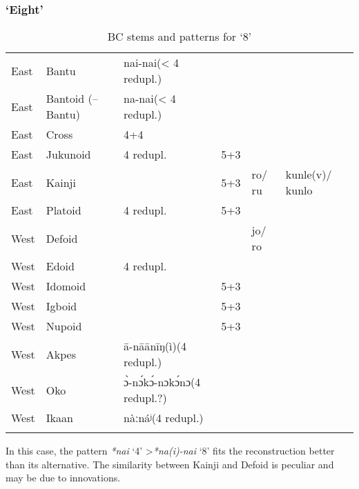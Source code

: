 \subsubsection{‘Eight’}\label{sec:3.1.4.6}
\begin{table}
\caption{\label{tab:3:59}BC stems and patterns for `8'}


\begin{tabularx}{\textwidth}{llQlll}
\lsptoprule

East & {Bantu} & nai-nai\newline (< 4 redupl.) &   &   &  \\
East & {Bantoid} {(–Bantu)} & na-nai\newline (< 4 redupl.) &   &   &  \\
East & {Cross} & 4+4 &   &   &  \\
East & {Jukunoid} & 4 redupl. & 5+3 &   &  \\
East & {Kainji} &   & 5+3 & ro/ ru & kunle(v)/ kunlo\\
East & {Platoid} & 4 redupl. & 5+3 &   &  \\
West & {Defoid} &   &   & jo/ ro &  \\
West & {Edoid} & 4 redupl. &   &   &  \\
West & {Idomoid} &   & 5+3 &   &  \\
West & {Igboid} &   & 5+3 &   &  \\
West & {Nupoid} &   & 5+3 &   &  \\
West & {Akpes} & {\={a}}-n{\={a}}{\={a}}n{\={i}}ŋ(ì)\newline (4 redupl.) &   &   &  \\
West & {Oko} & {\`{ɔ}}-n{\'{ɔ}}k{\'{ɔ}}-nɔk{\'{ɔ}}nɔ\newline(4 redupl.?) &   &   &  \\
West & {Ikaan} & nàːnáʲ\newline (4 redupl.) &   &   &  \\
\lspbottomrule
\end{tabularx}
\end{table}
In this case, the pattern \textit{*nai} ‘4’ >\textit{*na(i)-nai} ‘8’ fits the reconstruction better than its alternative. The similarity between Kainji and Defoid is peculiar and may be due to innovations. 

\clearpage
